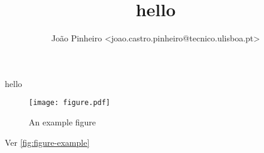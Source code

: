 \documentclass[portuguese, a4paper, titlepage]{article}
\title{hello}
\author{João Pinheiro <joao.castro.pinheiro@tecnico.ulisboa.pt>}
\begin{document}
	\hypersetup{pageanchor=false}
	\maketitle
	\hypersetup{pageanchor=true}

	hello

	\begin{figure}[h]
		\centering
		\texttt{[image: figure.pdf]}
		\caption{An example figure}
		\label{fig:figure-example}
	\end{figure}

	Ver \autoref{fig:figure-example}
\end{document}
